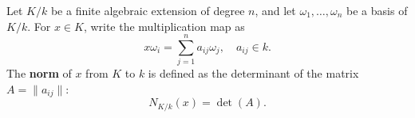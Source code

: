 Let $K/k$ be a finite algebraic extension of degree $n$, and let $\omega_1, \dots, \omega_n$ be a basis of $K/k$. For $x \in K$, write the multiplication map as
$$x\omega_i = \sum_{j=1}^{n} a_{ij}\omega_j, \quad a_{ij} \in k.$$
The \textbf{norm} of $x$ from $K$ to $k$ is defined as the determinant of the matrix $A = \|a_{ij}\|$:
$$N_{K/k}(x) = \det(A).$$
